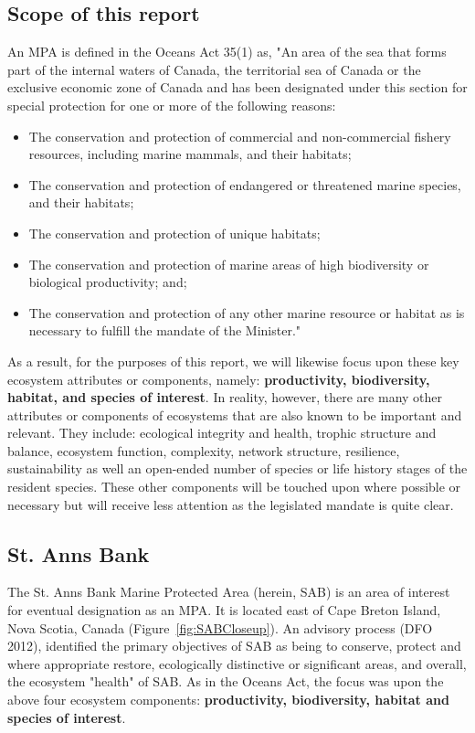 \documentclass[letterpaper,portrait,11pt]{scrartcl}
\numberwithin{equation}{section}		%
\numberwithin{figure}{section}		%
\numberwithin{table}{section}				%
\begin{document}
\subsection{Scope of this report}
An MPA is defined in the Oceans Act 35(1) as, "An area of the sea that forms part of the internal waters of Canada, the territorial sea of Canada or the exclusive economic zone of Canada and has been designated under this section for special protection for one or more of the following reasons: 

\begin{itemize}
  \item The conservation and protection of commercial and non-commercial fishery resources, including marine mammals, and their habitats; 
  \item The conservation and protection of endangered or threatened marine species, and their habitats; 
  \item The conservation and protection of unique habitats; 
  \item The conservation and protection of marine areas of high biodiversity or biological productivity; and; 
  \item The conservation and protection of any other marine resource or habitat as is necessary to fulfill the mandate of the Minister."
\end{itemize}

As a result, for the purposes of this report, we will likewise focus upon these key ecosystem attributes or components, namely: \textbf{productivity, biodiversity, habitat, and  species of interest}. In reality, however, there are many other attributes or components of ecosystems that are also known to be important and relevant. They include: ecological integrity and health, trophic structure and balance, ecosystem function, complexity, network structure, resilience, sustainability as well an open-ended number of species or life history stages of the resident species. These other components will be touched upon where possible or necessary but will receive less attention as the legislated mandate is quite clear. 

\subsection{St. Anns Bank}
The St. Anns Bank Marine Protected Area (herein, SAB) is an area of interest for eventual designation as an MPA. It is located east of Cape Breton Island, Nova Scotia, Canada (Figure~\ref{fig:SABCloseup}). An advisory process (DFO 2012), identified the primary objectives of SAB as being to conserve, protect and where appropriate restore, ecologically distinctive or significant areas, and overall, the ecosystem "health" of SAB. As in the Oceans Act, the focus was upon the above four ecosystem components: \textbf{productivity, biodiversity, habitat and species of interest}.
\end{document}

